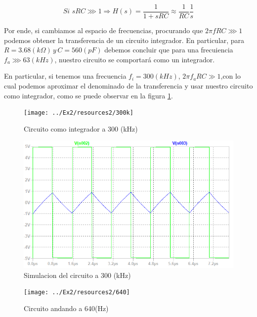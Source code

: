 \[
Si\,\,sRC\ggg1\Longrightarrow H(s)=\frac{1}{1+sRC}\approx\frac{1}{RC}\frac{1}{s}
\]

Por ende, si cambiamos al espacio de frecuencias, procurando que $2\pi fRC\ggg1$
podemos obtener la transferencia de un circuito integrador. En particular,
para $R=3.68(k\Omega)\,y\,C=560(pF)$ debemos concluir que para una
frecuiencia $f_{a}\ggg63(kHz)$, nuestro circuito se comportará como
un integrador.

En particular, si tenemos una frecuencia $f_{i}=300(kHz)$, $2\pi f_{a}RC\gg1$,con
lo cual podemos aproximar el denominado de la transferencia y usar
nuestro circuito como integrador, como se puede observar en la figura
\ref{2_6}.

\begin{figure}[h]
\begin{centering}
\texttt{[image: ../Ex2/resources2/300k]}
\par\end{centering}
\caption{Circuito como integrador a 300 (kHz)}
\label{2_6}

\end{figure}

\begin{figure}[h]
\begin{centering}
\includegraphics[scale=0.6]{../Ex2/resources2/sim}
\par\end{centering}
\caption{Simulacion del circuito a 300 (kHz)}

\end{figure}

\begin{figure}[h]
\begin{centering}
\texttt{[image: ../Ex2/resources2/640]}
\par\end{centering}
\caption{Circuito andando a 640(Hz)}

\end{figure}